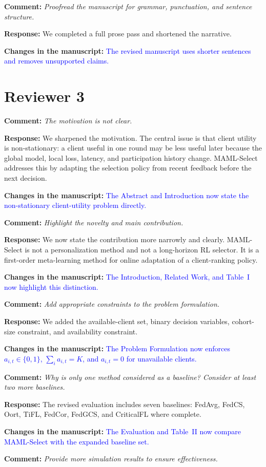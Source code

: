 \documentclass[11pt]{article}
\newcommand{\comment}[1]{\textbf{Comment:} \textit{#1}}
\newcommand{\response}[1]{\textbf{Response:} #1}
\newcommand{\change}[1]{\textbf{Changes in the manuscript:} \textcolor{blue}{#1}}
\begin{document}
\comment{Proofread the manuscript for grammar, punctuation, and sentence structure.}

\response{We completed a full prose pass and shortened the narrative.}

\change{The revised manuscript uses shorter sentences and removes unsupported claims.}

\section*{Reviewer 3}

\comment{The motivation is not clear.}

\response{We sharpened the motivation. The central issue is that client utility is non-stationary: a client useful in one round may be less useful later because the global model, local loss, latency, and participation history change. MAML-Select addresses this by adapting the selection policy from recent feedback before the next decision.}

\change{The Abstract and Introduction now state the non-stationary client-utility problem directly.}

\comment{Highlight the novelty and main contribution.}

\response{We now state the contribution more narrowly and clearly. MAML-Select is not a personalization method and not a long-horizon RL selector. It is a first-order meta-learning method for online adaptation of a client-ranking policy.}

\change{The Introduction, Related Work, and Table~I now highlight this distinction.}

\comment{Add appropriate constraints to the problem formulation.}

\response{We added the available-client set, binary decision variables, cohort-size constraint, and availability constraint.}

\change{The Problem Formulation now enforces $a_{i,t}\in\{0,1\}$, $\sum_i a_{i,t}=K$, and $a_{i,t}=0$ for unavailable clients.}

\comment{Why is only one method considered as a baseline? Consider at least two more baselines.}

\response{The revised evaluation includes seven baselines: FedAvg, FedCS, Oort, TiFL, FedCor, FedGCS, and CriticalFL where complete.}

\change{The Evaluation and Table~II now compare MAML-Select with the expanded baseline set.}

\comment{Provide more simulation results to ensure effectiveness.}
\end{document}

